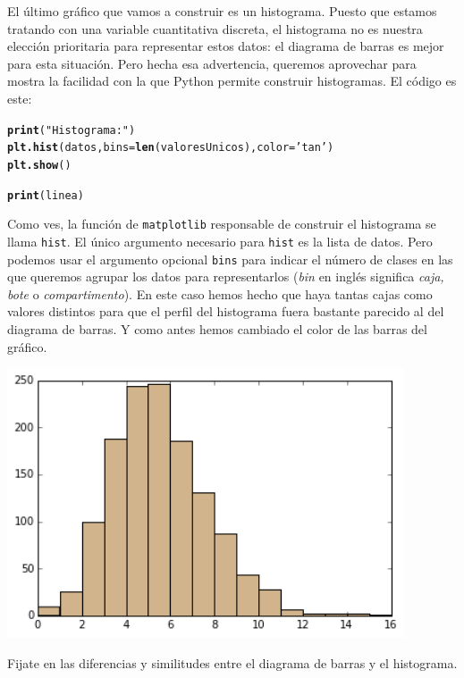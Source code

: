 \documentclass[10pt,a4paper]{article}\usepackage[]{graphicx}\usepackage[]{color}
\makeatletter
\newcommand{\hlstr}[1]{\textcolor[rgb]{0.192,0.494,0.8}{#1}}%
\newcommand{\hlstd}[1]{\textcolor[rgb]{0.345,0.345,0.345}{#1}}%
\newcommand{\hlkwc}[1]{\textcolor[rgb]{0.333,0.667,0.333}{#1}}%
\newcommand{\hlkwd}[1]{\textcolor[rgb]{0.737,0.353,0.396}{\textbf{#1}}}%
\newenvironment{kframe}{%
 \def\at@end@of@kframe{}%
 \ifinner\ifhmode%
  \def\at@end@of@kframe{\end{minipage}}%
  \begin{minipage}{\columnwidth}%
 \fi\fi%
 \def\FrameCommand##1{\hskip\@totalleftmargin \hskip-\fboxsep
 \colorbox{shadecolor}{##1}\hskip-\fboxsep
     \hskip-\linewidth \hskip-\@totalleftmargin \hskip\columnwidth}%
 \MakeFramed {\advance\hsize-\width
   \@totalleftmargin\z@ \linewidth\hsize
   \@setminipage}}%
 {\par\unskip\endMakeFramed%
 \at@end@of@kframe}
\newenvironment{knitrout}{}{} %
\makeatother
\begin{document}
El último gráfico que vamos a construir es un histograma. Puesto que estamos tratando con una variable cuantitativa discreta, el histograma no es nuestra elección prioritaria para representar estos datos: el diagrama de barras es mejor para esta situación. Pero hecha esa advertencia, queremos aprovechar para mostra la facilidad con la que Python permite construir histogramas. El código es este:
\begin{knitrout}
\color{fgcolor}\begin{kframe}
\begin{alltt}
\hlkwd{print}\hlstd{(}\hlstr{"Histograma:"}\hlstd{)}
\hlkwd{plt.hist}\hlstd{(datos,} \hlkwc{bins}\hlstd{=}\hlkwd{len}\hlstd{(valoresUnicos),} \hlkwc{color}\hlstd{=}\hlstr{'tan'}\hlstd{)}
\hlkwd{plt.show}\hlstd{()}

\hlkwd{print}\hlstd{(linea)}
\end{alltt}
\end{kframe}
\end{knitrout}
Como ves, la función de {\tt matplotlib} responsable de construir el histograma se llama {\tt hist}. El único argumento necesario para {\tt hist} es la lista de datos. Pero podemos usar el argumento opcional {\tt bins} para indicar el número de clases en las que queremos agrupar los datos para representarlos ({\em bin} en inglés significa {\em caja, bote} o {\em compartimento}). En este caso hemos hecho que haya tantas cajas como valores distintos para que el perfil del histograma fuera bastante parecido al del diagrama de barras. Y como antes hemos cambiado el color de las barras del gráfico.
\begin{center}
\includegraphics[height=8cm]{../fig/Tut-02-py-05-histograma.png}
\end{center}
Fijate en las diferencias y similitudes entre el diagrama de barras y el histograma.
\end{document}
